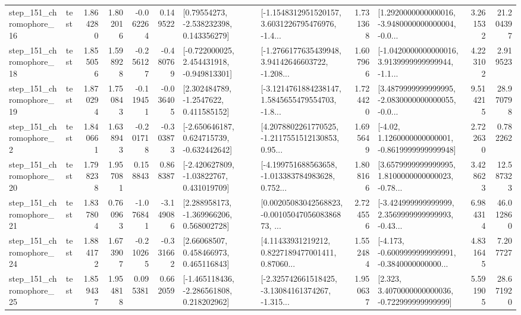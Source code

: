 \begin{tabular}{llrrrrllrlrr}
  step\_151\_chromophore\_16 &      test &      1.864280 &    1.802016 &     -0.062264 &  0.149522 &     [0.79554273, -2.538232398, 0.143356279] &  [-1.1548312951520157, 3.6031226795476976, -1.4... &       1.731368 &  [1.2920000000000016, -3.9480000000000004, -0.0... &            3.261532 &         21.204397 \\
  step\_151\_chromophore\_18 &      test &      1.855056 &    1.598928 &     -0.256127 & -0.480769 &   [-0.722000025, 2.454431918, -0.949813301] &  [-1.2766177635439948, 3.94142646603722, -1.208... &       1.607966 &  [-1.0420000000000016, 3.9139999999999944, -1.1... &            4.223102 &          2.919523 \\
  step\_151\_chromophore\_19 &      test &      1.870294 &    1.750843 &     -0.119451 & -0.036405 &      [2.302484789, -1.2547622, 0.411585152] &  [-3.1214761884238147, 1.5845655479554703, -1.8... &       1.724420 &  [3.4879999999999995, -2.0830000000000055, -0.0... &            9.514215 &         28.970798 \\
   step\_151\_chromophore\_2 &      test &      1.840661 &    1.638943 &     -0.201718 & -0.303873 &   [-2.650646187, 0.624715739, -0.632442642] &  [4.2078802261770525, -1.2117551512130853, 0.95... &       1.695649 &   [-4.02, 1.1260000000000001, -0.8619999999999948] &            2.722630 &          0.782262 \\
  step\_151\_chromophore\_20 &      test &      1.798238 &    1.957081 &      0.158843 &  0.868387 &    [-2.420627809, -1.03822767, 0.431019709] &  [-4.199751688563658, -1.013383784983628, 0.752... &       1.808166 &  [3.6579999999999995, 1.8100000000000023, -0.78... &            3.428623 &         12.587323 \\
  step\_151\_chromophore\_21 &      test &      1.837804 &    0.760963 &     -1.076841 & -3.149086 &    [2.288958173, -1.369966206, 0.568002728] &  [0.00205083042568823, -0.0010504705608386873, ... &       2.724556 &  [-3.424999999999999, 2.3569999999999993, -0.43... &            6.984314 &         46.012860 \\
  step\_151\_chromophore\_24 &      test &      1.884172 &    1.673907 &     -0.210265 & -0.331662 &      [2.66068507, 0.458466973, 0.465116843] &  [4.11433931219212, 0.8227189477001411, 0.87060... &       1.552484 &  [-4.173, -0.6009999999999991, -0.3840000000000... &            4.831645 &          7.207727 \\
  step\_151\_chromophore\_25 &      test &      1.859437 &    1.954818 &      0.095381 &  0.662059 &   [-1.465118436, -2.286561808, 0.218202962] &  [-2.325742661518425, -3.13084161374267, -1.315... &       1.950637 &    [2.323, 3.4070000000000036, -0.722999999999999] &            5.591905 &         28.671920 \\

\end{tabular}
